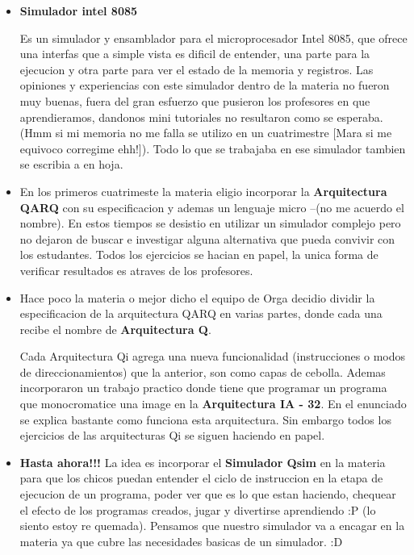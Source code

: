 \begin{itemize}

\item \textbf{Simulador intel 8085}

Es un simulador y ensamblador para el microprocesador Intel 8085, que ofrece una interfas que a simple vista es dificil de entender, una parte para la ejecucion y otra parte para ver el estado de la memoria y registros. 
Las opiniones y experiencias con este simulador dentro de la materia no fueron muy buenas, fuera del gran esfuerzo que pusieron los profesores en que aprendieramos, dandonos mini tutoriales no resultaron como se esperaba. (Hmm si mi memoria no me falla se utilizo en un cuatrimestre [Mara si me equivoco corregime ehh!]). 
Todo lo que se trabajaba en ese simulador tambien se escribia a en hoja. 

\item En los primeros cuatrimeste la materia eligio incorporar la \textbf{Arquitectura QARQ} con su especificacion y ademas un lenguaje micro --(no me acuerdo el nombre). 
En estos tiempos se desistio en utilizar un simulador complejo pero no dejaron de buscar e investigar alguna alternativa que pueda convivir con los estudantes. Todos los ejercicios se hacian en papel, la unica forma de verificar resultados es atraves de los profesores.

\item Hace poco la materia o mejor dicho el equipo de Orga decidio dividir la especificacion de la arquitectura QARQ en varias partes, donde cada una recibe el nombre de \textbf{Arquitectura Q}. 

Cada Arquitectura Qi agrega una nueva funcionalidad (instrucciones o modos de direccionamientos) que la anterior, son como capas de cebolla. Ademas incorporaron un trabajo practico donde tiene que programar un programa que monocromatice una image en la \textbf{Arquitectura IA - 32}. En el enunciado se explica bastante como funciona esta arquitectura. Sin embargo todos los ejercicios de las arquitecturas Qi se siguen haciendo en papel.  

\item \textbf{Hasta ahora!!!} 
La idea es incorporar el \textbf{Simulador Qsim} en la materia para que los chicos puedan entender el ciclo de instruccion en la etapa de ejecucion de un programa, poder ver que es lo que estan haciendo, chequear el efecto de los programas creados, jugar y divertirse aprendiendo :P (lo siento estoy re quemada). Pensamos que nuestro simulador va a encagar en la materia ya que cubre las necesidades basicas de un simulador. :D

\end{itemize}
